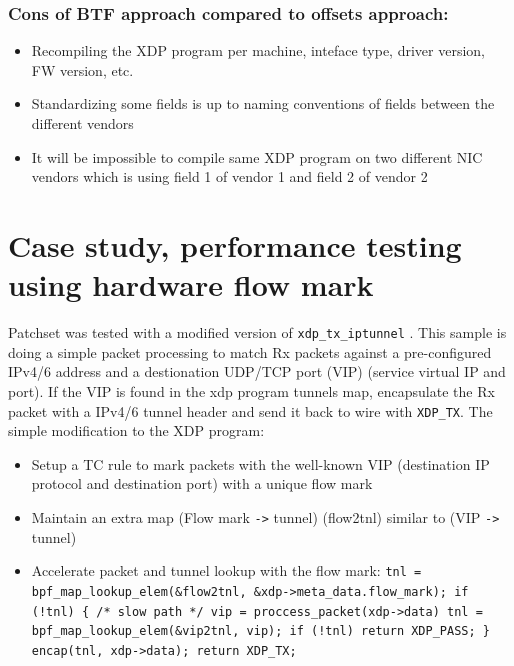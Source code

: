\documentclass[letterpaper]{article}
\begin{document}
\begin{itemize}
\subsubsection{Cons of BTF approach compared to offsets approach:}
	\begin{itemize}
		\item Recompiling the XDP program per machine, inteface type, driver version, FW version, etc.
		\item Standardizing some fields is up to naming conventions of fields between the different vendors
		\item It will be impossible to compile same XDP program on two different NIC vendors which is using field 1 of vendor 1 and field 2 of vendor 2
	\end{itemize}

\end{itemize}

\section{Case study, performance testing using hardware flow mark}

Patchset \cite{mlx-xdp-meta-patches-2018} was tested with a modified version of \small{\texttt{xdp\_tx\_iptunnel}} \cite{xdp-tx-iptunnel-2016} \cite{mlx-xdp-tx-iptunnel-2018}. This sample is doing a simple packet processing to match Rx packets against a pre-configured IPv4/6 address and a destionation UDP/TCP port (VIP) (service virtual IP and port). If the VIP is found in the xdp program tunnels map, encapsulate the Rx packet with a IPv4/6 tunnel header and send it back to wire with \small{\texttt{XDP\_TX}}.
\newline
\newline
The simple modification to the XDP program:
\begin{itemize}
	\item Setup a TC rule to mark packets with the well-known VIP (destination IP protocol and destination port) with a unique flow mark
	\item Maintain an extra map (Flow mark \small{\texttt{->}} tunnel) (flow2tnl) similar to (VIP \small{\texttt{->}} tunnel)
	\item Accelerate packet and tunnel lookup with the flow mark:
	\newline
		{\scriptsize \texttt{tnl = bpf\_map\_lookup\_elem(\&flow2tnl, \&xdp->meta\_data.flow\_mark);
		\newline
		if (!tnl) \{  /* slow path */
		\newline
		\indent vip = proccess\_packet(xdp->data)
		\newline
		\indent tnl = bpf\_map\_lookup\_elem(\&vip2tnl, vip);
		\newline
		\indent if (!tnl)
		\newline
		\indent \indent return XDP\_PASS;
		\newline
		\}
		\newline
		encap(tnl, xdp->data);
		return XDP\_TX;
		}}
\end{itemize}
\end{document}
